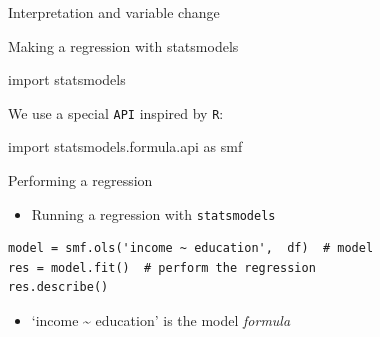 \documentclass[
  ignorenonframetext,
  aspectratio=169,
]{beamer}
\newenvironment{Shaded}{\begin{snugshade}}{\end{snugshade}}
\newcommand{\ImportTok}[1]{\textcolor[rgb]{0.00,0.46,0.62}{#1}}
\newcommand{\NormalTok}[1]{\textcolor[rgb]{0.00,0.23,0.31}{#1}}
\providecommand{\tightlist}{%
  \setlength{\itemsep}{0pt}\setlength{\parskip}{0pt}}\usepackage{longtable,booktabs,array}
\begin{document}
\begin{frame}[fragile]{Interpretation and variable change}
\protect\hypertarget{interpretation-and-variable-change}{}
\begin{block}{Making a regression with statsmodels}
\protect\hypertarget{making-a-regression-with-statsmodels}{}
\begin{Shaded}
\begin{Highlighting}[]
\ImportTok{import}\NormalTok{ statsmodels}
\end{Highlighting}
\end{Shaded}

We use a special \texttt{API} inspired by \texttt{R}:

\begin{Shaded}
\begin{Highlighting}[]
\ImportTok{import}\NormalTok{ statsmodels.formula.api }\ImportTok{as}\NormalTok{ smf}
\end{Highlighting}
\end{Shaded}
\end{block}

\begin{block}{Performing a regression}
\protect\hypertarget{performing-a-regression}{}
\begin{itemize}
\tightlist
\item
  Running a regression with \texttt{statsmodels}
\end{itemize}

\begin{verbatim}
model = smf.ols('income ~ education',  df)  # model
res = model.fit()  # perform the regression
res.describe()
\end{verbatim}

\begin{itemize}
\tightlist
\item
  `income \textasciitilde{} education' is the model \emph{formula}
\end{itemize}


\end{block}
\end{frame}
\end{document}
